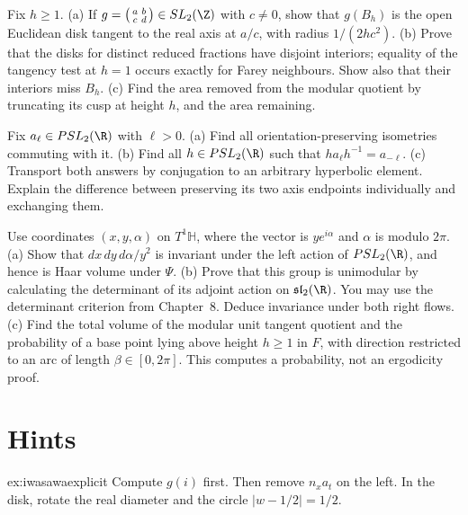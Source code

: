 \begin{exercise}[$\star\star$]\label{ex:v9-ch09-ford-horoballs}
Fix $h\ge1$.
(a) If $g=\bigl(\begin{smallmatrix}a&b\\c&d\end{smallmatrix}\bigr)\in SL_2(\Z)$ with $c\ne0$, show that $g(B_h)$ is the open Euclidean disk tangent to the real axis at $a/c$, with radius $1/(2hc^2)$.
(b) Prove that the disks for distinct reduced fractions have disjoint interiors; equality of the tangency test at $h=1$ occurs exactly for Farey neighbours. Show also that their interiors miss $B_h$.
(c) Find the area removed from the modular quotient by truncating its cusp at height $h$, and the area remaining.
\end{exercise}

\begin{exercise}[$\star\star$]\label{ex:v9-ch09-axis-centralizer}
Fix $a_\ell\in PSL_2(\R)$ with $\ell>0$.
(a) Find all orientation-preserving isometries commuting with it.
(b) Find all $h\in PSL_2(\R)$ such that $ha_\ell h^{-1}=a_{-\ell}$.
(c) Transport both answers by conjugation to an arbitrary hyperbolic element. Explain the difference between preserving its two axis endpoints individually and exchanging them.
\end{exercise}

\begin{exercise}[$\star\star\star$]\label{ex:v9-ch09-direction-measure}
Use coordinates $(x,y,\alpha)$ on $T^1\mathbb H$, where the vector is $y e^{i\alpha}$ and $\alpha$ is modulo $2\pi$.
(a) Show that $dx\,dy\,d\alpha/y^2$ is invariant under the left action of $PSL_2(\R)$, and hence is Haar volume under $\Psi$.
(b) Prove that this group is unimodular by calculating the determinant of its adjoint action on $\mathfrak{sl}_2(\R)$. You may use the determinant criterion from Chapter~8. Deduce invariance under both right flows.
(c) Find the total volume of the modular unit tangent quotient and the probability of a base point lying above height $h\ge1$ in $F$, with direction restricted to an arc of length $\beta\in[0,2\pi]$. This computes a probability, not an ergodicity proof.
\end{exercise}

\section{Hints}

\begin{hint}{ex:iwasawaexplicit}
Compute $g(i)$ first. Then remove $n_xa_t$ on the left. In the disk, rotate the real diameter and the circle $|w-1/2|=1/2$.
\end{hint}


